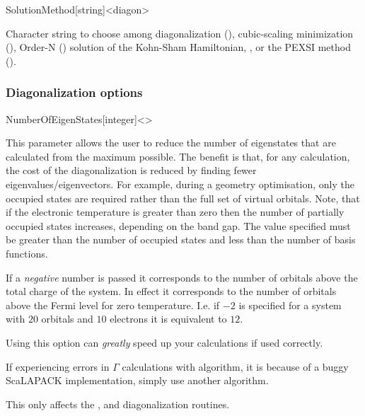 \begin{fdfentry}{SolutionMethod}[string]<diagon>

  Character string to choose among diagonalization (),
  cubic-scaling minimization (), Order-N ()
  solution of the Kohn-Sham Hamiltonian, , or the
  PEXSI method ().
  
\end{fdfentry}


\subsubsection{Diagonalization options}

\begin{fdfentry}{NumberOfEigenStates}[integer]<>

  This parameter allows the user to reduce the number of eigenstates
  that are calculated from the maximum possible. The benefit is that,
  for any calculation, the cost of the diagonalization is reduced by
  finding fewer eigenvalues/eigenvectors. For example, during a
  geometry optimisation, only the occupied states are required rather
  than the full set of virtual orbitals. Note, that if the electronic
  temperature is greater than zero then the number of partially
  occupied states increases, depending on the band gap. The value
  specified must be greater than the number of occupied states and
  less than the number of basis functions.

  If a \emph{negative} number is passed it corresponds to the number
  of orbitals above the total charge of the system. In effect it
  corresponds to the number of orbitals above the Fermi level for zero
  temperature. I.e. if $-2$ is specified for a system with $20$
  orbitals and $10$ electrons it is equivalent to $12$.

  Using this option can \emph{greatly} speed up your calculations if
  used correctly.

  \note If experiencing  errors in $\Gamma$
  calculations with  algorithm, it is because of a buggy
  ScaLAPACK implementation, simply use another algorithm.

  \note This only affects the ,  and
   diagonalization routines.
  
\end{fdfentry}


